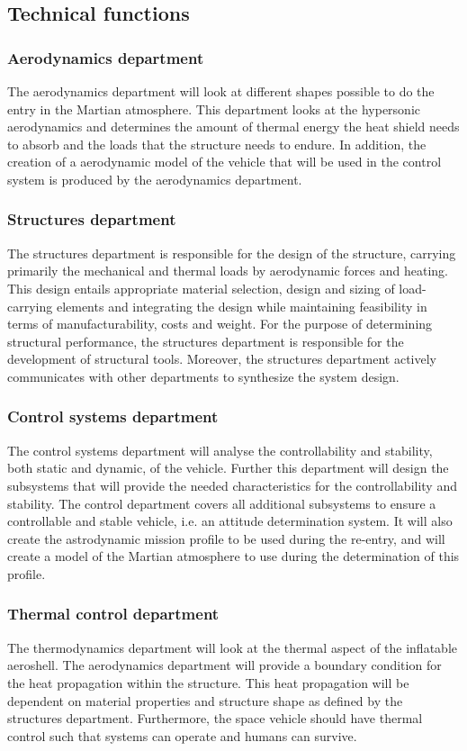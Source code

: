 \subsection{Technical functions}
\subsubsection{Aerodynamics department}\label{subsec:aero}
The aerodynamics department will look at different shapes possible to do the entry in the Martian atmosphere. This department looks at the hypersonic aerodynamics and determines the amount of thermal energy the heat shield needs to absorb and the loads that the structure needs to endure. In addition, the creation of a aerodynamic model of the vehicle that will be used in the control system is produced by the aerodynamics department.

\subsubsection{Structures department}\label{subsec:struct}
The structures department is responsible for the design of the structure, carrying primarily the mechanical and thermal loads by aerodynamic forces and heating. This design entails appropriate material selection, design and sizing of load-carrying elements and integrating the design while maintaining feasibility in terms of manufacturability, costs and weight. For the purpose of determining structural performance, the structures department is responsible for the development of structural tools. Moreover, the structures department actively communicates with other departments to synthesize the system design.

\subsubsection{Control systems department}\label{subsec:control}
The control systems department will analyse the controllability and stability, both static and dynamic, of the vehicle. Further this department will design the subsystems that will provide the needed characteristics for the controllability and stability. The control department covers all additional subsystems to ensure a controllable and stable vehicle, i.e. an attitude determination system. It will also create the astrodynamic mission profile to be used during the re-entry, and will create a model of the Martian atmosphere to use during the determination of this profile.

\subsubsection{Thermal control department}\label{subsec:therm}
The thermodynamics department will look at the thermal aspect of the inflatable aeroshell. The aerodynamics department will provide a boundary condition for the heat propagation within the structure. This heat propagation will be dependent on material properties and structure shape as defined by the structures department. Furthermore, the space vehicle should have thermal control such that systems can operate and humans can survive.